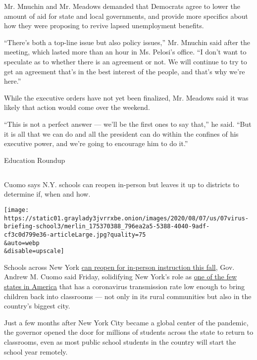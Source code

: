 Mr. Mnuchin and Mr. Meadows demanded that Democrats agree to lower the
amount of aid for state and local governments, and provide more
specifics about how they were proposing to revive lapsed unemployment
benefits.

``There's both a top-line issue but also policy issues,'' Mr. Mnuchin
said after the meeting, which lasted more than an hour in Ms. Pelosi's
office. ``I don't want to speculate as to whether there is an agreement
or not. We will continue to try to get an agreement that's in the best
interest of the people, and that's why we're here.''

While the executive orders have not yet been finalized, Mr. Meadows said
it was likely that action would come over the weekend.

``This is not a perfect answer --- we'll be the first ones to say
that,'' he said. ``But it is all that we can do and all the president
can do within the confines of his executive power, and we're going to
encourage him to do it.''

Education Roundup

\hypertarget{-1}{%
\subsection{}\label{-1}}

Cuomo says N.Y. schools can reopen in-person but leaves it up to
districts to determine if, when and how.

\texttt{[image: https://static01.graylady3jvrrxbe.onion/images/2020/08/07/us/07virus-briefing-school3/merlin\_175370388\_796ea2a5-5388-4040-9adf-cf3c0d799e36-articleLarge.jpg?quality=75\\\&auto=webp\\\&disable=upscale]}

Schools across New York
\href{https://www.nytimes3xbfgragh.onion/2020/08/07/nyregion/cuomo-schools-reopening.html}{can
reopen for in-person instruction this fall}, Gov. Andrew M. Cuomo said
Friday, solidifying New York's role as
\href{https://www.nytimes3xbfgragh.onion/2020/08/05/nyregion/nyc-schools-reopening.html}{one
of the few states in America} that has a coronavirus transmission rate
low enough to bring children back into classrooms --- not only in its
rural communities but also in the country's biggest city.

Just a few months after New York City became a global center of the
pandemic, the governor opened the door for millions of students across
the state to return to classrooms, even as most public school students
in the country will start the school year remotely.

